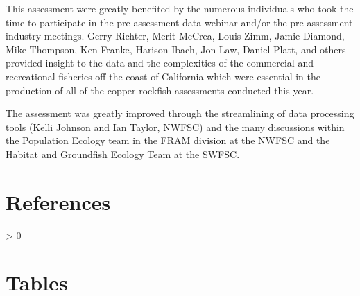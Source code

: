 \documentclass[11pt,
  letterpaper,
]{article}
\newlength{\cslhangindent}
\newenvironment{CSLReferences}[2] %
 {%
  \setlength{\parindent}{0pt}
  \ifodd #1 \everypar{\setlength{\hangindent}{\cslhangindent}}\ignorespaces\fi
  \ifnum #2 > 0
  \setlength{\parskip}{#2\baselineskip}
  \fi
 }%
 {}
\begin{document}
This assessment were greatly benefited by the numerous individuals who took the time to participate in the pre-assessment data webinar and/or the pre-assessment industry meetings. Gerry Richter, Merit McCrea, Louis Zimm, Jamie Diamond, Mike Thompson, Ken Franke, Harison Ibach, Jon Law, Daniel Platt, and others provided insight to the data and the complexities of the commercial and recreational fisheries off the coast of California which were essential in the production of all of the copper rockfish assessments conducted this year.

The assessment was greatly improved through the streamlining of data processing tools (Kelli Johnson and Ian Taylor, NWFSC) and the many discussions within the Population Ecology team in the FRAM division at the NWFSC and the Habitat and Groundfish Ecology Team at the SWFSC.

\clearpage

\section{References}\label{references}

\label{refs}
\begin{CSLReferences}{0}{1}
\end{CSLReferences}

\clearpage

\section{Tables}\label{tables}

\begingroup\fontsize{10}{12}\selectfont
\begingroup\fontsize{10}{12}\selectfont
\end{document}
